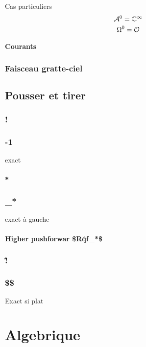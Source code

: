 Cas particuliers
\[
\mathcal{A}^0 = \mathbb{C}^\infty
\]
\[
\Omega^0 = \mathcal{O}
\]

\subsubsection{Courants}
\cite{Demailly}

\subsection{Faisceau gratte-ciel}

\section{Pousser et tirer}

\subsection{!}

\subsection{-1}
exact

\subsubsection{\^*}

\subsection{\_*}
exact à gauche

\subsubsection{Higher pushforwar \$R\^qf\_*\$}

\subsection{\^!}

\subsection{\$\otimes\$}
Exact si plat

\chapter{Algebrique}

